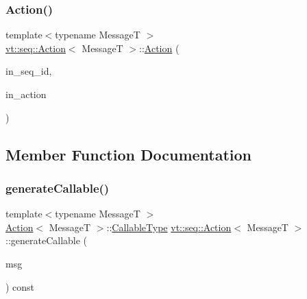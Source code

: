 \subsubsection{\texorpdfstring{Action()}{Action()}}
{\footnotesize\ttfamily template$<$typename MessageT $>$ \\
\hyperlink{structvt_1_1seq_1_1_action}{vt\+::seq\+::\+Action}$<$ MessageT $>$\+::\hyperlink{structvt_1_1seq_1_1_action}{Action} (\begin{DoxyParamCaption}\item[{\hyperlink{namespacevt_1_1seq_a3b612da217ac669d39c159f134ab8434}{Seq\+Type} const \&}]{in\+\_\+seq\+\_\+id,  }\item[{\hyperlink{structvt_1_1seq_1_1_action_ae38fc2cf91f5654f548ea386ee603963}{Action\+Type} const \&}]{in\+\_\+action }\end{DoxyParamCaption})}



\subsection{Member Function Documentation}
\mbox{\label{structvt_1_1seq_1_1_action_ae1a2087109fa13a4f77d8ad8ce534fe0}} 
\subsubsection{\texorpdfstring{generate\+Callable()}{generateCallable()}}
{\footnotesize\ttfamily template$<$typename MessageT $>$ \\
\hyperlink{structvt_1_1seq_1_1_action}{Action}$<$ MessageT $>$\+::\hyperlink{structvt_1_1seq_1_1_action_a6c683ecf97baa16ca6432b6773aa8f89}{Callable\+Type} \hyperlink{structvt_1_1seq_1_1_action}{vt\+::seq\+::\+Action}$<$ MessageT $>$\+::generate\+Callable (\begin{DoxyParamCaption}\item[{\hyperlink{namespacevt_ab2b3d506ec8e8d1540aede826d84a239}{Msg\+Shared\+Ptr}$<$ MessageT $>$}]{msg }\end{DoxyParamCaption}) const}

\mbox{\label{structvt_1_1seq_1_1_action_aeed40bb2f54409d70596c33ad92b8fd4}} 
